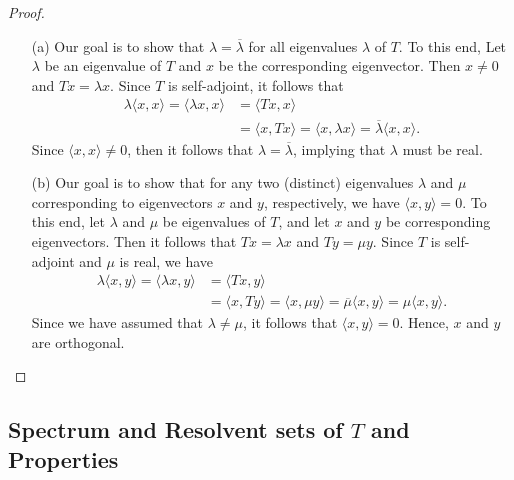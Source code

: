 \begin{proof}
\begin{enumerate}
    \item[(a)] Our goal is to show that \( \lambda = \overline{\lambda} \) for all eigenvalues \( \lambda  \) of \( T  \). To this end, Let \( \lambda  \) be an eigenvalue of \( T  \) and \( x  \) be the corresponding eigenvector. Then \( x \neq 0  \) and \( Tx = \lambda x  \). Since \( T  \) is self-adjoint, it follows that 
        \begin{align*}
            \lambda \langle x  ,  x  \rangle = \langle \lambda x  ,  x  \rangle &= \langle Tx  ,  x  \rangle    \\
                                                                                &= \langle x  ,  Tx  \rangle = \langle x  , \lambda x  \rangle = \overline{\lambda} \langle x  ,  x  \rangle.
        \end{align*}
        Since \( \langle x  ,  x  \rangle \neq 0  \), then it follows that \( \lambda = \overline{\lambda} \), implying that \( \lambda  \) must be real.
    \item[(b)] Our goal is to show that for any two (distinct) eigenvalues \( \lambda  \) and \( \mu  \) corresponding to eigenvectors \(  x \) and \( y  \), respectively, we have \( \langle x , y \rangle = 0  \). To this end, let \(\lambda \) and \( \mu  \) be eigenvalues of \( T  \), and let \( x  \) and \( y  \) be corresponding eigenvectors. Then it follows that \( Tx = \lambda x  \) and \( T  y = \mu y   \). Since \( T  \) is self-adjoint and \( \mu  \) is real, we have  
        \begin{align*}
            \lambda \langle  x  , y \rangle = \langle \lambda x  , y \rangle &= \langle Tx  , y \rangle \\
                                                                             &= \langle x  ,  Ty \rangle = \langle x  ,  \mu y  \rangle = \overline{\mu} \langle x , y \rangle = \mu \langle x  , y \rangle.
        \end{align*}
        Since we have assumed that \( \lambda \neq \mu \), it follows that \( \langle x , y  \rangle = 0  \). Hence, \( x  \) and \( y  \) are orthogonal.
\end{enumerate}
\end{proof}

\subsection{Spectrum and Resolvent sets of \( T  \) and Properties}


